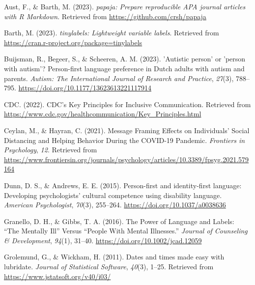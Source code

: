 \documentclass[
  man]{apa6}
\newlength{\cslhangindent}
\newlength{\cslentryspacingunit} %
\newenvironment{CSLReferences}[2] %
 {%
  \setlength{\parindent}{0pt}
  \ifodd #1
  \let\oldpar\par
  \def\par{\hangindent=\cslhangindent\oldpar}
  \fi
  \setlength{\parskip}{#2\cslentryspacingunit}
 }%
 {}
\begin{document}
\hypertarget{refs}{}
\begin{CSLReferences}{1}{0}
\leavevmode{}%
Aust, F., \& Barth, M. (2023). \emph{{papaja}: {Prepare} reproducible {APA} journal articles with {R Markdown}}. Retrieved from \url{https://github.com/crsh/papaja}

\leavevmode{}%
Barth, M. (2023). \emph{{tinylabels}: Lightweight variable labels}. Retrieved from \url{https://cran.r-project.org/package=tinylabels}

\leavevmode{}%
Buijsman, R., Begeer, S., \& Scheeren, A. M. (2023). '{Autistic} person' or 'person with autism'? {Person}-first language preference in {Dutch} adults with autism and parents. \emph{Autism: The International Journal of Research and Practice}, \emph{27}(3), 788--795. \url{https://doi.org/10.1177/13623613221117914}

\leavevmode{}%
CDC. (2022). {CDC}'s {Key} {Principles} for {Inclusive} {Communication}. Retrieved from \url{https://www.cdc.gov/healthcommunication/Key_Principles.html}

\leavevmode{}%
Ceylan, M., \& Hayran, C. (2021). Message {Framing} {Effects} on {Individuals}' {Social} {Distancing} and {Helping} {Behavior} {During} the {COVID}-19 {Pandemic}. \emph{Frontiers in Psychology}, \emph{12}. Retrieved from \url{https://www.frontiersin.org/journals/psychology/articles/10.3389/fpsyg.2021.579164}

\leavevmode{}%
Dunn, D. S., \& Andrews, E. E. (2015). Person-first and identity-first language: {Developing} psychologists' cultural competence using disability language. \emph{American Psychologist}, \emph{70}(3), 255--264. \url{https://doi.org/10.1037/a0038636}

\leavevmode{}%
Granello, D. H., \& Gibbs, T. A. (2016). The {Power} of {Language} and {Labels}: {``{The} {Mentally} {Ill}''} {Versus} {``{People} {With} {Mental} {Illnesses}.''} \emph{Journal of Counseling \& Development}, \emph{94}(1), 31--40. \url{https://doi.org/10.1002/jcad.12059}

\leavevmode{}%
Grolemund, G., \& Wickham, H. (2011). Dates and times made easy with {lubridate}. \emph{Journal of Statistical Software}, \emph{40}(3), 1--25. Retrieved from \url{https://www.jstatsoft.org/v40/i03/}


\end{CSLReferences}
\end{document}
